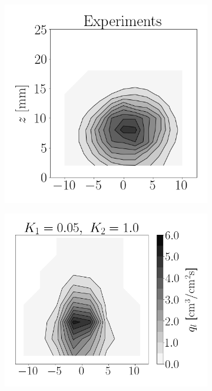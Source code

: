 \begin{figure}[t!]
\flushleft
\begin{subfigure}[b]{0.2\textwidth}
	\flushleft
   \includegraphics[scale=0.4]{./part2_developments/figures_ch6_lagrangian_JICF/apte_model_calibration_u_vw_lognorm/maps/expe_flux}
\end{subfigure}
\hspace*{0.27in}
\begin{subfigure}[b]{0.2\textwidth}
	\flushleft
   \includegraphics[scale=0.4]{./part2_developments/figures_ch6_lagrangian_JICF/apte_model_calibration_u_vw_lognorm/maps/k1_0p05_k2_1p0_flux}

\end{subfigure}
\end{figure}
